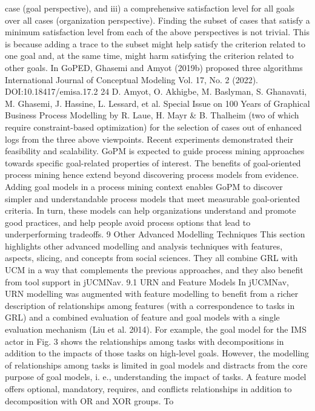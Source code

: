 case (goal perspective), and iii) a comprehensive
satisfaction level for all goals over all cases (organization perspective). Finding the subset of
cases that satisfy a minimum satisfaction level
from each of the above perspectives is not trivial.
This is because adding a trace to the subset might
help satisfy the criterion related to one goal and,
at the same time, might harm satisfying the criterion related to other goals. In GoPED, Ghasemi
and Amyot (2019b) proposed three algorithms
International Journal of Conceptual Modeling
Vol. 17, No. 2 (2022). DOI:10.18417/emisa.17.2
24 D. Amyot, O. Akhigbe, M. Baslyman, S. Ghanavati, M. Ghasemi, J. Hassine, L. Lessard, et al.
Special Issue on 100 Years of Graphical Business Process Modelling by R. Laue, H. Mayr & B. Thalheim
(two of which require constraint-based optimization) for the selection of cases out of enhanced
logs from the three above viewpoints. Recent
experiments demonstrated their feasibility and
scalability. GoPM is expected to guide process
mining approaches towards specific goal-related
properties of interest.
The benefits of goal-oriented process mining
hence extend beyond discovering process models
from evidence. Adding goal models in a process
mining context enables GoPM to discover simpler and understandable process models that meet
measurable goal-oriented criteria. In turn, these
models can help organizations understand and
promote good practices, and help people avoid
process options that lead to underperforming tradeoffs.
9 Other Advanced Modelling Techniques
This section highlights other advanced modelling
and analysis techniques with features, aspects,
slicing, and concepts from social sciences. They
all combine GRL with UCM in a way that complements the previous approaches, and they also
benefit from tool support in jUCMNav.
9.1 URN and Feature Models
In jUCMNav, URN modelling was augmented
with feature modelling to benefit from a richer
description of relationships among features (with
a correspondence to tasks in GRL) and a combined evaluation of feature and goal models with
a single evaluation mechanism (Liu et al. 2014).
For example, the goal model for the IMS actor in
Fig. 3 shows the relationships among tasks with
decompositions in addition to the impacts of those
tasks on high-level goals. However, the modelling
of relationships among tasks is limited in goal
models and distracts from the core purpose of
goal models, i. e., understanding the impact of
tasks. A feature model offers optional, mandatory,
requires, and conflicts relationships in addition
to decomposition with OR and XOR groups. To
